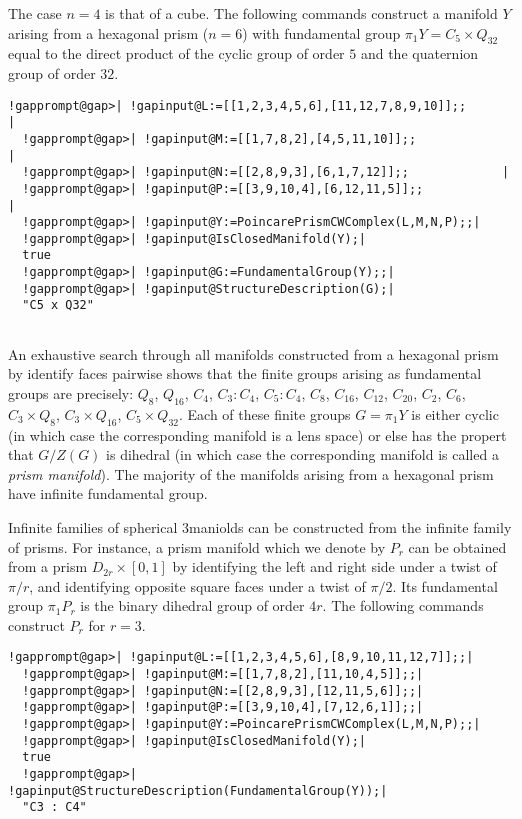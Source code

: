 \documentclass[a4paper,11pt]{report}
\begin{document}
{{  

The case $n=4$ is that of a cube. The following commands construct a manifold $Y$ arising from a hexagonal prism ($n=6$) with fundamental group $\pi_1Y=C_5\times Q_{32}$ equal to the direct product of the cyclic group of order $5$ and the quaternion group of order $32$. 
\begin{Verbatim}[commandchars=!@|,fontsize=\small,frame=single,label=Example]
  !gapprompt@gap>| !gapinput@L:=[[1,2,3,4,5,6],[11,12,7,8,9,10]];;                 |
  !gapprompt@gap>| !gapinput@M:=[[1,7,8,2],[4,5,11,10]];;             |
  !gapprompt@gap>| !gapinput@N:=[[2,8,9,3],[6,1,7,12]];;             |
  !gapprompt@gap>| !gapinput@P:=[[3,9,10,4],[6,12,11,5]];;             |
  !gapprompt@gap>| !gapinput@Y:=PoincarePrismCWComplex(L,M,N,P);;|
  !gapprompt@gap>| !gapinput@IsClosedManifold(Y);|
  true
  !gapprompt@gap>| !gapinput@G:=FundamentalGroup(Y);;|
  !gapprompt@gap>| !gapinput@StructureDescription(G);|
  "C5 x Q32"
  
\end{Verbatim}
 

An exhaustive search through all manifolds constructed from a hexagonal prism
by identify faces pairwise shows that the finite groups arising as fundamental
groups are precisely: $ Q_8$, $Q_{16}$, $C_4$, $ C_3 : C_4$, $ C_5 : C_4$, $ C_8$, $C_{16}$, $C_{12}$, $C_{20}$, $C_2$, $ C_6$, $ C_3 \times Q_8$, $ C_3 \times Q_{16}$, $C_5 \times Q_{32} $. Each of these finite groups $G=\pi_1Y$ is either cyclic (in which case the corresponding manifold is a lens space) or
else has the propert that $G/Z(G)$ is dihedral (in which case the corresponding manifold is called a \emph{prism manifold}). The majority of the manifolds arising from a hexagonal prism have infinite
fundamental group. 

 Infinite families of spherical $3$\texttt{}maniolds can be constructed from the infinite family of
prisms. For instance, a prism manifold which we denote by $P_r$ can be obtained from a prism $D_{2r}\times [0,1]$ by identifying the left and right side under a twist of $\pi/r$, and identifying opposite square faces under a twist of $\pi/2$. Its fundamental group $\pi_1P_r$ is the binary dihedral group of order $4r$. The following commands construct $P_r$ for $r=3$. 
\begin{Verbatim}[commandchars=!@|,fontsize=\small,frame=single,label=Example]
  !gapprompt@gap>| !gapinput@L:=[[1,2,3,4,5,6],[8,9,10,11,12,7]];;|
  !gapprompt@gap>| !gapinput@M:=[[1,7,8,2],[11,10,4,5]];;|
  !gapprompt@gap>| !gapinput@N:=[[2,8,9,3],[12,11,5,6]];;|
  !gapprompt@gap>| !gapinput@P:=[[3,9,10,4],[7,12,6,1]];;|
  !gapprompt@gap>| !gapinput@Y:=PoincarePrismCWComplex(L,M,N,P);;|
  !gapprompt@gap>| !gapinput@IsClosedManifold(Y);|
  true
  !gapprompt@gap>| !gapinput@StructureDescription(FundamentalGroup(Y));|
  "C3 : C4"
  

\end{Verbatim}}}
\end{document}
